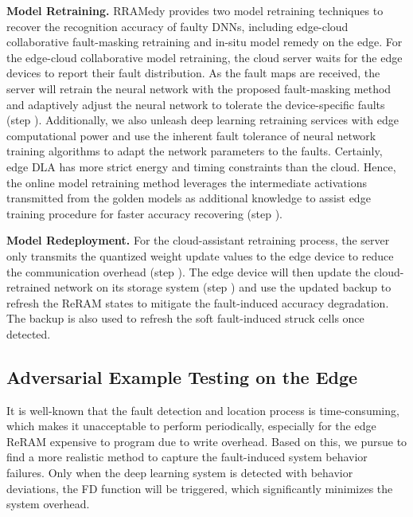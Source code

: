\textbf{Model Retraining.} RRAMedy provides two model retraining techniques to recover the recognition accuracy of faulty DNNs, including edge-cloud collaborative fault-masking retraining and in-situ model remedy on the edge. For the edge-cloud collaborative model retraining, the cloud server waits for the edge devices to report their fault distribution. As the fault maps are received, the server will retrain the neural network with the proposed fault-masking method and adaptively adjust the neural network to tolerate the device-specific faults (step ). Additionally, we also unleash deep learning retraining services with edge computational power and use the inherent fault tolerance of neural network training algorithms to adapt the network parameters to the faults. Certainly, edge DLA has more strict energy and timing constraints than the cloud. Hence, the online model retraining method leverages the intermediate activations transmitted from the golden models as additional knowledge to assist edge training procedure for faster accuracy recovering (step ).
                                                                                                                            
                                                                                                                                
\textbf{Model Redeployment.} For the cloud-assistant retraining process,  the server only transmits the quantized weight update values to the edge device to reduce the communication overhead (step ). The edge device will then update the cloud-retrained network on its storage system (step ) and use the updated backup to refresh the ReRAM states to mitigate the fault-induced accuracy degradation. The backup is also used to refresh the soft fault-induced struck cells once detected.
                                                                                                                                        
\subsection{Adversarial Example Testing on the Edge}
It is well-known that the fault detection and location process is time-consuming, which makes it unacceptable to perform periodically, especially for the edge ReRAM expensive to program due to write overhead. Based on this, we pursue to find a more realistic method to capture the fault-induced system behavior failures. Only when the deep learning system is detected with behavior deviations, the FD function will be triggered, which significantly minimizes the system overhead. 
    
